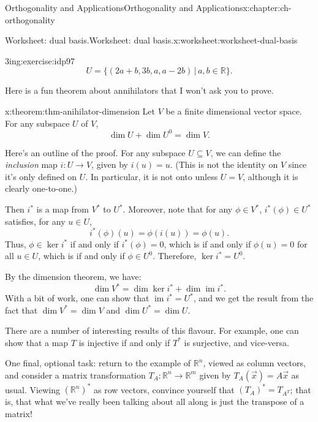 \documentclass[oneside,10pt,]{book}
\numberwithin{equation}{section}
\newcommand{\R}{\mathbb{R}}
\begin{document}
\begin{chapterptx}{Orthogonality and Applications}{}{Orthogonality and Applications}{}{}{x:chapter:ch-orthogonality}
\begin{worksheet-section}{Worksheet: dual basis.}{}{Worksheet: dual basis.}{}{}{x:worksheet:worksheet-dual-basis}
\begin{divisionexercise}{5}{}{3in}{g:exercise:idp97}
\begin{equation*}
U = \{(2a+b,3b,a,a-2b)\,|\, a,b\in\R\}\text{.}
\end{equation*}
%
\end{divisionexercise}%
\clearpage
Here is a fun theorem about annihilators that I won't ask you to prove.%
\begin{theorem}{}{}{x:theorem:thm-anihilator-dimension}%
Let \(V\) be a finite dimensional vector space. For any subspace \(U\) of \(V\),%
\begin{equation*}
\dim U + \dim U^0 = \dim V\text{.}
\end{equation*}
%
\end{theorem}
Here's an outline of the proof. For any subspace \(U\subseteq V\), we can define the \emph{inclusion} map \(i:U\to V\), given by \(i(u)=u\). (This is not the identity on \(V\) since it's only defined on \(U\). In particular, it is not onto unless \(U=V\), although it is clearly one-to-one.)%
\par
Then \(i^*\) is a map from \(V^*\) to \(U^*\). Moreover, note that for any \(\phi\in V^*\), \(i^*(\phi)\in U^*\) satisfies, for any \(u\in U\),%
\begin{equation*}
i^*(\phi)(u) = \phi(i(u))=\phi(u)\text{.}
\end{equation*}
Thus, \(\phi\in \ker i^*\) if and only if \(i^*(\phi)=0\), which is if and only if \(\phi(u)=0\) for all \(u\in U\), which is if and only if \(\phi\in U^0\). Therefore, \(\ker i^* = U^0\).%
\par
By the dimension theorem, we have:%
\begin{equation*}
\dim V^* = \dim \ker i^* + \dim \operatorname{im} i^*\text{.}
\end{equation*}
With a bit of work, one can show that \(\operatorname{im} i^* = U^*\), and we get the result from the fact that \(\dim V^*=\dim V\) and \(\dim U^* = \dim U\).%
\par
There are a number of interesting results of this flavour. For example, one can show that a map \(T\) is injective if and only if \(T^*\) is surjective, and vice-versa.%
\par
One final, optional task: return to the example of \(\R^n\), viewed as column vectors, and consider a matrix transformation \(T_A:\R^n\to \R^m\) given by \(T_A(\vec{x}) = A\vec{x}\) as usual. Viewing \((\R^n)^*\) as row vectors, convince yourself that \((T_A)^* = T_{A^T}\); that is, that what we've really been talking about all along is just the transpose of a matrix!%
\end{worksheet-section}
\restoregeometry
\end{chapterptx}
\end{document}
